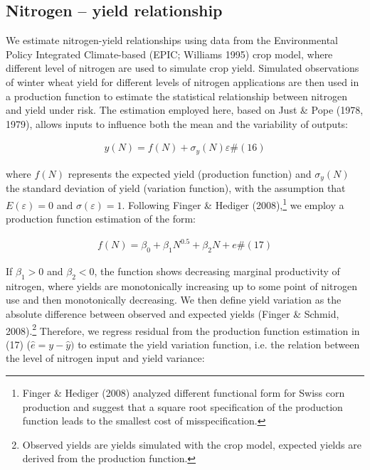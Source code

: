 \documentclass[
]{article}
\begin{document}
\subsection{\texorpdfstring{Nitrogen -- yield relationship
}{Nitrogen -- yield relationship }}\label{nitrogen-yield-relationship}

We estimate nitrogen-yield relationships using data from the
Environmental Policy Integrated Climate-based (EPIC; Williams 1995) crop
model, where different level of nitrogen are used to simulate crop
yield. Simulated observations of winter wheat yield for different levels
of nitrogen applications are then used in a production function to
estimate the statistical relationship between nitrogen and yield under
risk. The estimation employed here, based on Just \& Pope (1978, 1979),
allows inputs to influence both the mean and the variability of outputs:

\[\begin{array}{r}
y(N) = f(N) + \sigma_{y}(N)\varepsilon\#(16)
\end{array}\]

where \(f(N)\) represents the expected yield (production function) and
\(\sigma_{y}(N)\) the standard deviation of yield (variation function),
with the assumption that \(E(\varepsilon) = 0\) and
\(\sigma(\varepsilon) = 1\). Following Finger \& Hediger
(2008),\footnote{Finger \& Hediger (2008) analyzed different functional
  form for Swiss corn production and suggest that a square root
  specification of the production function leads to the smallest cost of
  misspecification.} we employ a production function estimation of the
form:

\[\begin{array}{r}
f(N) = \beta_{0} + \beta_{1}N^{0.5} + \beta_{2}N + e\#(17)
\end{array}\]

If \(\beta_{1} > 0\) and \(\beta_{2} < 0\), the function shows
decreasing marginal productivity of nitrogen, where yields are
monotonically increasing up to some point of nitrogen use and then
monotonically decreasing. We then define yield variation as the absolute
difference between observed and expected yields (Finger \& Schmid,
2008).\footnote{Observed yields are yields simulated with the crop
  model, expected yields are derived from the production function.}
Therefore, we regress residual from the production function estimation
in (17) (\(\widehat{e} = y - \widehat{y})\) to estimate the yield
variation function, i.e. the relation between the level of nitrogen
input and yield variance:
\end{document}
